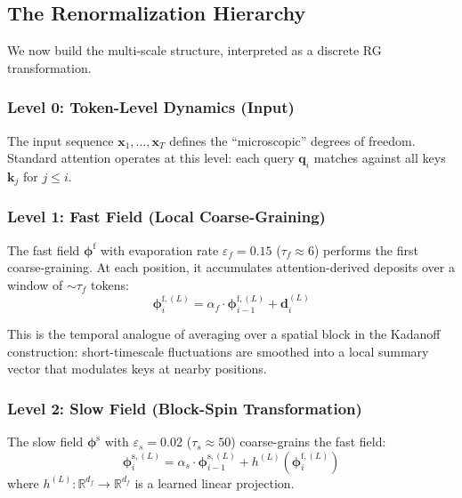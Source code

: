 \documentclass[11pt,a4paper]{article}
\newcommand{\vfield}{\boldsymbol{\phi}}
\newcommand{\vdeposit}{\mathbf{d}}
\newcommand{\evap}{\varepsilon}
\newcommand{\retain}{\alpha}
\newcommand{\R}{\mathbb{R}}
\newcommand{\x}{\mathbf{x}}
\newcommand{\q}{\mathbf{q}}
\newcommand{\K}{\mathbf{k}}
\begin{document}
\subsection{The Renormalization Hierarchy}
\label{sec:rg-hierarchy}

We now build the multi-scale structure, interpreted as a discrete
RG transformation.

\subsubsection{Level 0: Token-Level Dynamics (Input)}

The input sequence $\x_1, \ldots, \x_T$ defines the ``microscopic''
degrees of freedom.  Standard attention operates at this level:
each query $\q_i$ matches against all keys $\K_j$ for $j \leq i$.

\subsubsection{Level 1: Fast Field (Local Coarse-Graining)}

The fast field $\vfield^{\mathrm{f}}$ with evaporation rate
$\evap_f = 0.15$ ($\tau_f \approx 6$) performs the first
coarse-graining.  At each position, it accumulates
attention-derived deposits over a window of $\sim\!\tau_f$ tokens:
\begin{equation}
  \vfield^{\mathrm{f},(L)}_i
    = \retain_f \cdot \vfield^{\mathrm{f},(L)}_{i-1}
    + \vdeposit_i^{(L)}
  \label{eq:fast}
\end{equation}

This is the temporal analogue of averaging over a spatial block in
the Kadanoff construction: short-timescale fluctuations are smoothed
into a local summary vector that modulates keys at nearby positions.

\subsubsection{Level 2: Slow Field (Block-Spin Transformation)}

The slow field $\vfield^{\mathrm{s}}$ with $\evap_s = 0.02$
($\tau_s \approx 50$) coarse-grains the fast field:
\begin{equation}
  \vfield^{\mathrm{s},(L)}_i
    = \retain_s \cdot \vfield^{\mathrm{s},(L)}_{i-1}
    + h^{(L)}\!\left(\vfield^{\mathrm{f},(L)}_i\right)
  \label{eq:slow}
\end{equation}
where $h^{(L)}: \R^{d_f} \to \R^{d_f}$ is a learned linear
projection.
\end{document}
